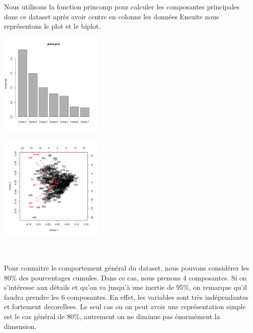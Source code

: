 \documentclass[10pt]{article}
\begin{document}
Nous utilisons la fonction princomp pour calculer les composantes principales dans ce dataset après avoir centre en colonne les données Ensuite nous représentons le plot et le biplot.
\\
\begin{minipage}{.5\textwidth}
	\centering
	\includegraphics[width=50mm]{Figures/Pima/pca_plot.png}
	\label{fig:pima_pca_plot}
\end{minipage}%
\hspace{0.08\linewidth}
\begin{minipage}{.5\textwidth}
	\centering
	\includegraphics[width=50mm]{Figures/Pima/pca_biplot.png}
	\label{fig:pima_pca_biplot}
\end{minipage}
\\
\\
Pour connaitre le comportement général du dataset, nous pouvons considérer les 80\% des pourcentages cumules. Dans ce cas, nous prenons 4 composantes. Si on s'intéresse aux détails et qu'on va jusqu'à une inertie de 95\%, on remarque qu'il faudra prendre les 6 composantes. En effet, les variables sont très indépendantes et fortement decorellees. Le seul cas ou on peut avoir une représentation simple est le cas général de 80\%, autrement on ne diminue pas énormément la dimension.
	
\end{document}
